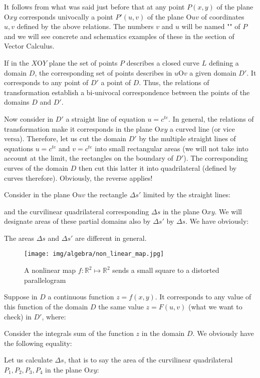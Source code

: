 	It follows from what was said just before that at any point $P(x,y)$ of the plane $\text{O}xy$  corresponds univocally a point $P '(u, v)$ of the plane $\text{O}uv$ of coordinates $u, v$ defined by the above relations. The numbers $v$ and $u$ will be named "" of $P$ and we will see concrete and schematics examples of these in the section of Vector Calculus.
	
	If in the $X\text{O}Y$ plane the set of points $P$ describes a closed curve $L$ defining a domain $D$, the corresponding set of points describes in $u\text{O}v$ a given domain $D'$. It corresponds to any point of $D'$ a point of $D$. Thus, the relations of transformation establish a bi-univocal correspondence between the points of the domains $D$ and $D'$.
	
	Now consider in $D'$ a straight line of equation $u=c^{te}$. In general, the relations of transformation make it corresponds in the plane $\text{O}xy$ a curved line (or vice versa). Therefore, let us cut the domain $D'$ by the multiple straight lines of equations $u=c^{te}$ and $v=c^{te}$ into small rectangular areas (we will not take into account at the limit, the rectangles on the boundary of $D'$). The corresponding curves of the domain $D$ then cut this latter it into quadrilateral (defined by curves therefore). Obviously, the reverse applies!
	
	Consider in the plane $\text{O}uv$ the rectangle $\Delta s'$ limited by the straight lines:
	
	and the curvilinear quadrilateral corresponding $\Delta s$ in the plane $\text{O}xy$. We will designate areas of these partial domains also  by $\Delta s'$ by $\Delta s$. We have obviously:
	
	The areas $\Delta s$ and $\Delta s'$ are different in general.
	 \begin{figure}[H]
		\centering
		\texttt{[image: img/algebra/non\_linear\_map.jpg]}
		\caption{A nonlinear map $f : \mathbb{R}^2\mapsto \mathbb{R}^2$ sends a small square to a distorted parallelogram}
	\end{figure}
	Suppose in $D$ a continuous function $z=f(x,y)$. It corresponds to any value of this function of the domain $D$ the same value $z=F(u,v)$ (what we want to check) in $D'$, where:
	
	Consider the integrals sum of the function $z$ in the domain $D$. We obviously have the following equality:
	
	Let us calculate $\Delta s$, that is to say the area of the curvilinear quadrilateral $P_1,P_2,P_3,P_4$ in the plane $\text{O}xy$:
	
